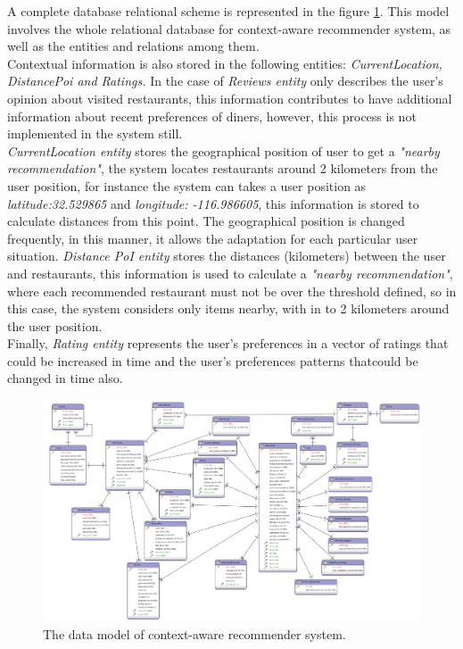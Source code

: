 A complete database relational scheme is represented in the figure
\ref{fig:datamodel}. This model involves the whole relational database for
context-aware recommender system, as well as the entities and
relations among them. \\
Contextual information is also stored in the following entities:
\textit{CurrentLocation, DistancePoi and Ratings.} 
In the case of \textit{Reviews entity}  only describes the user's 
opinion about visited restaurants, this information contributes to 
have additional information about recent preferences of diners, 
however, this process is not implemented in the system still. \\
\textit{CurrentLocation entity} stores the geographical position of
user to get a \textit{"nearby recommendation"}, the system locates
restaurants around 2 kilometers from the user position, for instance
the system can takes a user position as \textit{latitude:32.529865}
and \textit{longitude: -116.986605}, this information is stored to
calculate distances from this point. The geographical position is
changed frequently, in this manner, it allows the adaptation for each
particular user situation. \textit{Distance PoI entity} stores the
distances (kilometers) between the user and restaurants, this
information is used to calculate a \textit{"nearby recommendation"},
where each recommended restaurant must not be over the threshold defined, 
so in this case, the system considers only items nearby, with in to 2 kilometers 
around the user position.\\
Finally, \textit{Rating entity} represents the user's preferences  
in a vector of ratings that could be increased in time and  
the user's preferences patterns thatcould be changed in time also.
\begin{landscape} 
\begin{figure}[!h] 
\captionsetup{font=footnotesize}
\centering
\includegraphics[width=1.3\textwidth]{img/recomet.png}
\caption{The data model of context-aware recommender system.}
\label{fig:datamodel}    
\end{figure}
\end{landscape}

